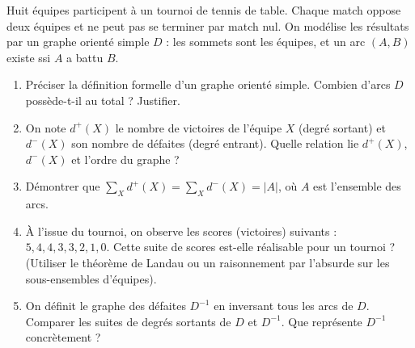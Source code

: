 \documentclass[11pt]{article}
\begin{document}
\begin{exercice}
Huit équipes participent à un tournoi de tennis de table. Chaque match oppose deux équipes et ne peut pas se terminer par match nul. On modélise les résultats par un graphe orienté simple $D$ : les sommets sont les équipes, et un arc $(A,B)$ existe ssi $A$ a battu $B$.
\begin{enumerate}
    \item Préciser la définition formelle d'un graphe orienté simple. Combien d'arcs $D$ possède-t-il au total ? Justifier.
    \item On note $d^+(X)$ le nombre de victoires de l'équipe $X$ (degré sortant) et $d^-(X)$ son nombre de défaites (degré entrant). Quelle relation lie $d^+(X)$, $d^-(X)$ et l'ordre du graphe ?
    \item Démontrer que $\sum_{X} d^+(X) = \sum_{X} d^-(X) = |A|$, où $A$ est l'ensemble des arcs.
    \item À l'issue du tournoi, on observe les scores (victoires) suivants : $5, 4, 4, 3, 3, 2, 1, 0$. Cette suite de scores est-elle réalisable pour un tournoi ? (Utiliser le théorème de Landau ou un raisonnement par l'absurde sur les sous-ensembles d'équipes).
    \item On définit le \og graphe des défaites \fg $D^{-1}$ en inversant tous les arcs de $D$. Comparer les suites de degrés sortants de $D$ et $D^{-1}$. Que représente $D^{-1}$ concrètement ?
\end{enumerate}
\end{exercice}
\end{document}

